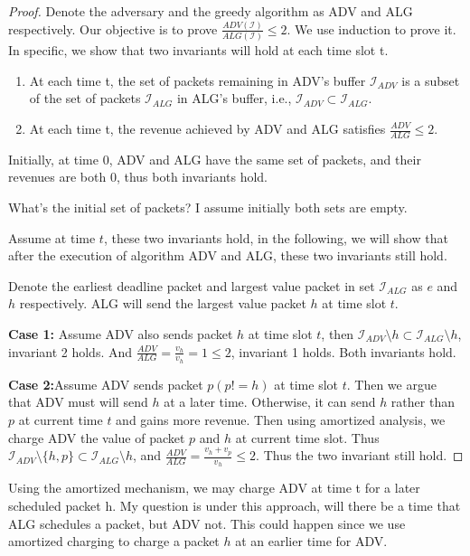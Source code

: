 \documentclass[10 pt,final]{article}
\newcommand{\question}[1]{{\color{blue} #1}}
\begin{document}
\begin{proof} Denote the adversary and the greedy algorithm as ADV and ALG respectively. Our objective is to prove $\frac{ADV(\mathcal{I})}{ALG(\mathcal{I})} \leq 2$. We use induction to prove it. In specific, we show that two invariants will hold at each time slot t.
\begin{enumerate}
\item At each time t, the set of packets remaining in ADV's buffer $\mathcal{I}_{ADV}$ is a subset of the set of packets $\mathcal{I}_{ALG}$ in ALG's buffer, i.e., $\mathcal{I}_{ADV} \subset \mathcal{I}_{ALG}$.
\item At each time t, the revenue achieved by ADV and ALG satisfies $\frac{ADV}{ALG} \leq 2$.
\end{enumerate}



Initially, at time $0$, ADV and ALG have the same set of packets, and their revenues are both $0$, thus both invariants hold. 

\question{What's the initial set of packets? I assume initially both sets are empty.}

Assume at time $t$, these two invariants hold, in the following, we will show that after the execution of algorithm ADV and ALG, these two invariants still hold. 

Denote the earliest deadline packet and largest value packet in set $\mathcal{I}_{ALG}$ as $e$ and $h$ respectively. ALG will send the largest value packet $h$ at time slot $t$.

\textbf{Case 1:} Assume ADV also sends packet $h$ at time slot $t$, then $\mathcal{I}_{ADV} \setminus h \subset \mathcal{I}_{ALG} \setminus h$, invariant 2 holds. And $\frac{ADV}{ALG} = \frac{v_h}{v_h} = 1 \leq 2$, invariant 1 holds. Both invariants hold.

\textbf{Case 2:}Assume ADV sends packet $p (p!=h)$ at time slot $t$. Then we argue that ADV must will send $h$ at a later time. Otherwise, it can send $h$ rather than $p$ at current time $t$ and gains more revenue. Then using amortized analysis, we charge ADV the value of packet $p$ and $h$ at current time slot. Thus $\mathcal{I}_{ADV} \setminus \{h,p\} \subset \mathcal{I}_{ALG} \setminus h$, and $\frac{ADV}{ALG} = \frac{v_h+ v_p}{v_h} \leq 2$. Thus the two invariant still hold.
\end{proof}

\question{Using the amortized mechanism, we may charge ADV at time t for a later scheduled packet h. My question is under this approach, will there be a time that ALG schedules a packet, but ADV not. This could happen since we use amortized charging to charge a packet $h$ at an earlier time for ADV. }
\end{document}
